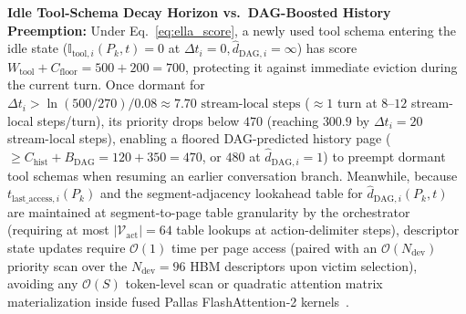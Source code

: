 \documentclass[conference,10pt]{IEEEtran}
\begin{document}
\textbf{Idle Tool-Schema Decay Horizon vs.\ DAG-Boosted History Preemption:} Under Eq.~\eqref{eq:ella_score}, a newly used tool schema entering the idle state ($\mathbb{I}_{\text{tool},i}(P_k, t) = 0$ at $\Delta t_i = 0, \hat{d}_{\text{DAG},i} = \infty$) has score $W_{\text{tool}} + C_{\text{floor}} = 500 + 200 = 700$, protecting it against immediate eviction during the current turn. Once dormant for $\Delta t_i > \ln(500/270)/0.08 \approx 7.70\text{ stream-local steps}$ ($\approx 1$ turn at $8\text{--}12$ stream-local steps/turn), its priority drops below $470$ (reaching $300.9$ by $\Delta t_i = 20$ stream-local steps), enabling a floored DAG-predicted history page ($\ge C_{\text{hist}} + B_{\text{DAG}} = 120 + 350 = 470$, or $480$ at $\hat{d}_{\text{DAG},i} = 1$) to preempt dormant tool schemas when resuming an earlier conversation branch. Meanwhile, because $t_{\text{last\_access},i}(P_k)$ and the segment-adjacency lookahead table for $\hat{d}_{\text{DAG},i}(P_k, t)$ are maintained at segment-to-page table granularity by the orchestrator (requiring at most $|\mathcal{V}_{\text{act}}| = 64$ table lookups at action-delimiter steps), descriptor state updates require $\mathcal{O}(1)$ time per page access (paired with an $\mathcal{O}(N_{\text{dev}})$ priority scan over the $N_{\text{dev}}=96$ HBM descriptors upon victim selection), avoiding any $\mathcal{O}(S)$ token-level scan or quadratic attention matrix materialization inside fused Pallas FlashAttention-2 kernels~\cite{dao2024flashattention2}.
\end{document}

